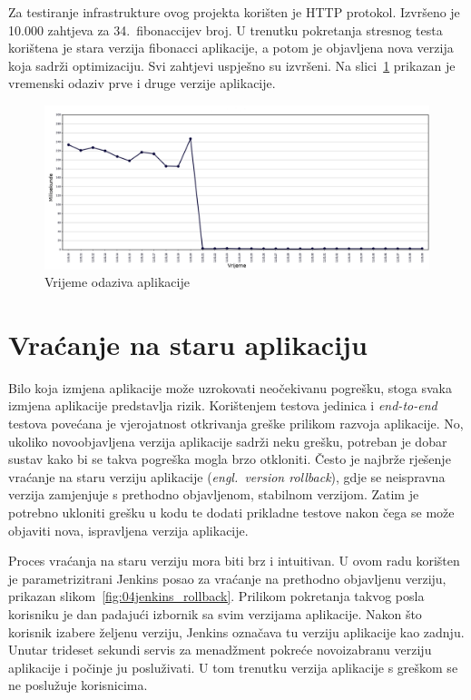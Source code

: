 Za testiranje infrastrukture ovog projekta korišten je HTTP protokol. Izvršeno je 10.000 zahtjeva
za 34.~fibonaccijev broj. U trenutku pokretanja stresnog testa korištena je stara verzija fibonacci
aplikacije, a potom je objavljena nova verzija koja sadrži optimizaciju. Svi zahtjevi uspješno su
izvršeni. Na slici~\ref{fig:04stresstest} prikazan je vremenski odaziv prve i druge verzije
aplikacije.

\begin{figure}[h]
    \centering
    \includegraphics[width=\textwidth]{img/04/response_time.png}
    \caption{Vrijeme odaziva aplikacije}%
    \label{fig:04stresstest}
\end{figure}

\section{Vraćanje na staru aplikaciju}
Bilo koja izmjena aplikacije može uzrokovati neočekivanu pogrešku, stoga svaka izmjena aplikacije
predstavlja rizik. Korištenjem testova jedinica i \textit{end-to-end} testova povećana je
vjerojatnost otkrivanja greške prilikom razvoja aplikacije. No, ukoliko novoobjavljena verzija
aplikacije sadrži neku grešku, potreban je dobar sustav kako bi se takva pogreška mogla brzo
otkloniti. Često je najbrže rješenje vraćanje na staru verziju aplikacije (\textit{engl.~version
rollback}), gdje se neispravna verzija zamjenjuje s prethodno objavljenom, stabilnom verzijom. Zatim
je potrebno ukloniti grešku u kodu te dodati prikladne testove nakon čega se može objaviti nova,
ispravljena verzija aplikacije.

Proces vraćanja na staru verziju mora biti brz i intuitivan. U ovom radu korišten je
parametrizitrani Jenkins posao za vraćanje na prethodno objavljenu verziju, prikazan
slikom~\ref{fig:04jenkins_rollback}. Prilikom pokretanja takvog posla korisniku je dan padajući
izbornik sa svim verzijama aplikacije. Nakon što korisnik izabere željenu verziju, Jenkins označava
tu verziju aplikacije kao zadnju. Unutar trideset sekundi servis za menadžment pokreće novoizabranu
verziju aplikacije i počinje ju posluživati. U tom trenutku verzija aplikacije s greškom se ne
poslužuje korisnicima.

